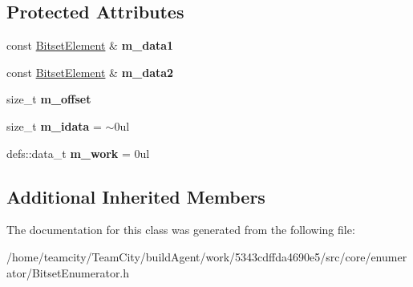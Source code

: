 \subsection*{Protected Attributes}
\begin{DoxyCompactItemize}
\item 
const \hyperlink{classBitsetElement}{Bitset\+Element} \& {\bfseries m\+\_\+data1}\hypertarget{classBitsetEnumerator_a7a9c33fce104b03ad93e982e84043de7}{}\label{classBitsetEnumerator_a7a9c33fce104b03ad93e982e84043de7}

\item 
const \hyperlink{classBitsetElement}{Bitset\+Element} \& {\bfseries m\+\_\+data2}\hypertarget{classBitsetEnumerator_aae1ee3784204f62f1759bf681ee28a4f}{}\label{classBitsetEnumerator_aae1ee3784204f62f1759bf681ee28a4f}

\item 
size\+\_\+t {\bfseries m\+\_\+offset}\hypertarget{classBitsetEnumerator_a5b51d281c1d7e85a4f102a9ed85528ae}{}\label{classBitsetEnumerator_a5b51d281c1d7e85a4f102a9ed85528ae}

\item 
size\+\_\+t {\bfseries m\+\_\+idata} = $\sim$0ul\hypertarget{classBitsetEnumerator_a45e95ec5fc9a2d27c63023947d501092}{}\label{classBitsetEnumerator_a45e95ec5fc9a2d27c63023947d501092}

\item 
defs\+::data\+\_\+t {\bfseries m\+\_\+work} = 0ul\hypertarget{classBitsetEnumerator_a3b3e4114e11171be5bc918362ecda275}{}\label{classBitsetEnumerator_a3b3e4114e11171be5bc918362ecda275}

\end{DoxyCompactItemize}
\subsection*{Additional Inherited Members}


The documentation for this class was generated from the following file\+:\begin{DoxyCompactItemize}
\item 
/home/teamcity/\+Team\+City/build\+Agent/work/5343cdffda4690e5/src/core/enumerator/Bitset\+Enumerator.\+h\end{DoxyCompactItemize}
